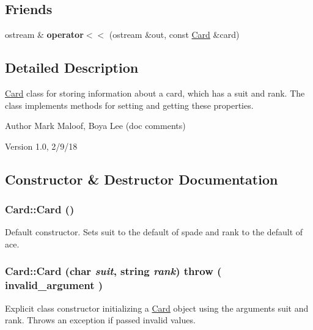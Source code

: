 \subsection*{Friends}
\begin{DoxyCompactItemize}
\item 
\hypertarget{classCard_ae22d1f7ec753f692bd2fea91975c510e}{
ostream \& {\bfseries operator$<$$<$} (ostream \&out, const \hyperlink{classCard}{Card} \&card)}
\label{classCard_ae22d1f7ec753f692bd2fea91975c510e}

\end{DoxyCompactItemize}


\subsection{Detailed Description}
\hyperlink{classCard}{Card} class for storing information about a card, which has a suit and rank. The class implements methods for setting and getting these properties.

\begin{DoxyAuthor}{Author}
Mark Maloof, Boya Lee (doc comments) 
\end{DoxyAuthor}
\begin{DoxyVersion}{Version}
1.0, 2/9/18 
\end{DoxyVersion}


\subsection{Constructor \& Destructor Documentation}
\hypertarget{classCard_a783f5854cbe8c183ee3d4414c01472c0}{
\subsubsection[{Card}]{\setlength{\rightskip}{0pt plus 5cm}Card::Card ()}}
\label{classCard_a783f5854cbe8c183ee3d4414c01472c0}
Default constructor. Sets suit to the default of spade and rank to the default of ace. \hypertarget{classCard_ae828e7f944693ad04df1e63bd5a30f19}{
\subsubsection[{Card}]{\setlength{\rightskip}{0pt plus 5cm}Card::Card (char {\em suit}, \/  string {\em rank})  throw ( invalid\_\-argument )}}
\label{classCard_ae828e7f944693ad04df1e63bd5a30f19}
Explicit class constructor initializing a \hyperlink{classCard}{Card} object using the arguments suit and rank. Throws an exception if passed invalid values.


